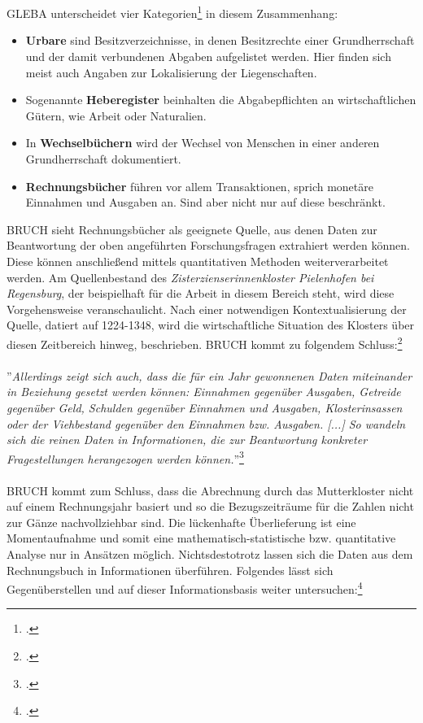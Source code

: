 \documentclass[12pt,a4paper]{article}
\begin{document}
\\
\\
GLEBA unterscheidet vier Kategorien\footcite[][S.51--54]{gleba2016rechnen} in diesem Zusammenhang:
\begin{itemize}
\item \textbf{Urbare} sind Besitzverzeichnisse, in denen Besitzrechte einer Grundherrschaft und der damit verbundenen Abgaben aufgelistet werden. Hier finden sich meist auch Angaben zur Lokalisierung der Liegenschaften.
\item Sogenannte \textbf{Heberegister} beinhalten die Abgabepflichten an wirtschaftlichen Gütern, wie Arbeit oder Naturalien.
\item In \textbf{Wechselbüchern} wird der Wechsel von Menschen in einer anderen Grundherrschaft dokumentiert. 
\item \textbf{Rechnungsbücher} führen vor allem Transaktionen, sprich monetäre Einnahmen und Ausgaben an. Sind aber nicht nur auf diese beschränkt.
\end{itemize}
BRUCH sieht Rechnungsbücher als geeignete Quelle, aus denen Daten zur Beantwortung der oben angeführten Forschungsfragen extrahiert werden können. Diese können anschließend mittels quantitativen Methoden weiterverarbeitet werden. Am Quellenbestand des \textit{Zisterzienserinnenkloster Pielenhofen bei Regensburg}, der beispielhaft für die Arbeit in diesem Bereich steht, wird diese Vorgehensweise veranschaulicht. Nach einer notwendigen Kontextualisierung der Quelle, datiert auf 1224-1348, wird die wirtschaftliche Situation des Klosters über diesen Zeitbereich hinweg, beschrieben. BRUCH kommt zu folgendem Schluss:\footcite[][S.13-37]{bruch2015daten}
\\
\\
''\textit{Allerdings zeigt sich auch, dass die für ein Jahr gewonnenen Daten miteinander in Beziehung gesetzt werden können: Einnahmen gegenüber Ausgaben, Getreide gegenüber Geld, Schulden gegenüber Einnahmen und Ausgaben, Klosterinsassen oder der Viehbestand gegenüber den Einnahmen bzw. Ausgaben. [...] So wandeln sich die reinen Daten in Informationen, die zur Beantwortung konkreter Fragestellungen herangezogen werden können.}''\footcite[Vgl.][S.37]{bruch2015daten}
\\
\\
BRUCH kommt zum Schluss, dass die Abrechnung durch das Mutterkloster nicht auf einem Rechnungsjahr basiert und so die Bezugszeiträume für die Zahlen nicht zur Gänze nachvollziehbar sind. Die lückenhafte Überlieferung ist eine Momentaufnahme und somit eine mathematisch-statistische bzw. quantitative Analyse nur in Ansätzen möglich. Nichtsdestotrotz lassen sich die Daten aus dem Rechnungsbuch in Informationen überführen. Folgendes lässt sich Gegenüberstellen und auf dieser Informationsbasis weiter untersuchen:\footcite[][S.37-44]{bruch2015daten}
\end{document}
